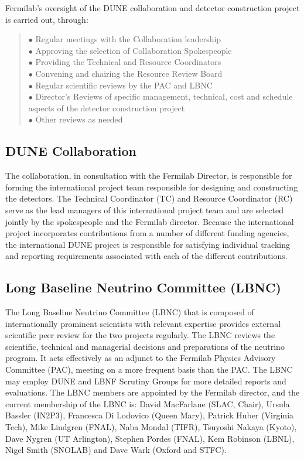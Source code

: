 Fermilab's oversight of the DUNE collaboration and detector
construction project is carried out, through:
\begin{quote}
$\bullet$ Regular meetings with the Collaboration leadership\\
$\bullet$ Approving the selection of Collaboration Spokespeople\\
$\bullet$ Providing the Technical and Resource Coordinators\\
$\bullet$ Convening and chairing the Resource Review Board\\
$\bullet$ Regular scientific reviews by the PAC and LBNC\\
$\bullet$ Director’s Reviews of specific management, technical,
cost and schedule aspects of the detector construction project\\
$\bullet$ Other reviews as needed
\end{quote}

\subsection{DUNE Collaboration}	

The collaboration, in consultation with the Fermilab Director,
is responsible for forming the international project team responsible
for designing and constructing the detectors.  The Technical Coordinator
(TC) and Resource Coordinator (RC) serve as the lead managers
of this international project team and are selected jointly by
the spokespeople and the Fermilab director.  Because the international
project incorporates contributions from a number of different
funding agencies, the international DUNE project is responsible for
satisfying individual tracking and reporting requirements associated
with each of the different contributions.

\subsection{Long Baseline Neutrino Committee (LBNC)}

The Long Baseline Neutrino Committee (LBNC) that is composed
of internationally prominent scientists with relevant expertise
provides external scientific peer review for the two projects regularly.
The LBNC reviews the scientific, technical and managerial
decisions and preparations of the neutrino program.
It acts effectively as an adjunct to the Fermilab Physics Advisory Committee
(PAC), meeting on a more frequent basis than the PAC.
The LBNC may employ DUNE and LBNF Scrutiny Groups for more
detailed reports and evaluations. The LBNC members are appointed by the
Fermilab director, and the current membership of the LBNC is:
David MacFarlane (SLAC, Chair),
Ursula Bassler (IN2P3),
Francesca Di Lodovico (Queen Mary),
Patrick Huber (Virginia Tech),
Mike Lindgren (FNAL),
Naba Mondal (TIFR),
Tsuyoshi Nakaya (Kyoto),
Dave Nygren (UT Arlington),
Stephen Pordes (FNAL),
Kem Robinson (LBNL),
Nigel Smith (SNOLAB) and
Dave Wark (Oxford and STFC).

